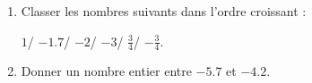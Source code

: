 
\begin{exercice}\label{exo2smath-0284}

    \begin{enumerate}
        \item
            Classer les nombres suivants dans l'ordre croissant :
            
            \( 1\)/ \( -1.7\)/ \( -2\)/ \( -3\)/ \( \frac{ 3 }{ 4 }\)/ \( -\frac{ 3 }{ 4 }\).
        \item
            Donner un nombre entier entre \( -5.7\) et \( -4.2\).
    \end{enumerate}

\end{exercice}
